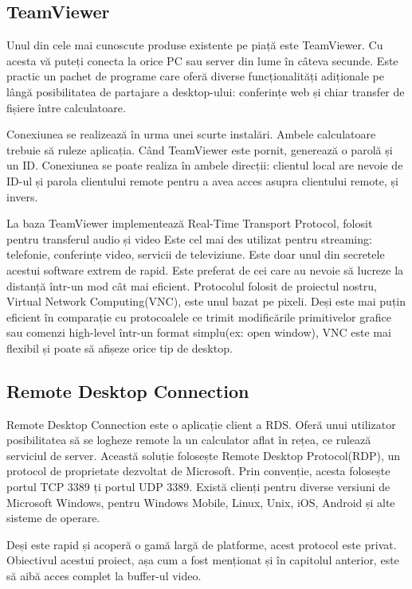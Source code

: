 \subsection{TeamViewer}
Unul din cele mai cunoscute produse existente pe piață este TeamViewer. Cu acesta vă puteți conecta la orice PC sau server din lume în câteva secunde. Este practic un pachet de programe care oferă diverse funcționalități adiționale pe lângă posibilitatea de partajare a desktop-ului: conferințe web și chiar transfer de fișiere între calculatoare. 

Conexiunea se realizează în urma unei scurte instalări. Ambele calculatoare trebuie să ruleze aplicația. Când TeamViewer este pornit, generează o parolă și un ID. Conexiunea se poate realiza în ambele direcții: clientul local are nevoie de ID-ul și parola clientului remote pentru a avea acces asupra clientului remote, și invers.

La baza TeamViewer implementează Real-Time Transport Protocol, folosit pentru transferul audio și video%
Este cel mai des utilizat pentru streaming: telefonie, conferințe video, servicii de televiziune. Este doar unul din secretele acestui software extrem de rapid. Este preferat de cei care au nevoie să lucreze la distanță într-un mod cât mai eficient. Protocolul folosit de proiectul nostru, Virtual Network Computing(VNC), este unul bazat pe pixeli. %
Deși este mai puțin eficient în comparație cu protocoalele ce trimit modificările primitivelor grafice sau comenzi high-level într-un format simplu(ex: open window), VNC este mai flexibil și poate să afișeze orice tip de desktop.

\subsection{Remote Desktop Connection}
Remote Desktop Connection este o aplicație client a RDS. Oferă unui utilizator posibilitatea să se logheze remote la un calculator aflat în rețea, ce rulează serviciul de server. Această soluție folosește Remote Desktop Protocol(RDP), un protocol de proprietate dezvoltat de Microsoft. Prin convenție, acesta folosește portul TCP 3389 ți portul UDP 3389.%
Există clienți pentru diverse versiuni de Microsoft Windows, pentru Windows Mobile, Linux, Unix, iOS, Android și alte sisteme de operare.

Deși este rapid și acoperă o gamă largă de platforme, acest protocol este privat. Obiectivul acestui proiect, așa cum a fost menționat și în capitolul anterior, este să aibă acces complet la buffer-ul video. 

